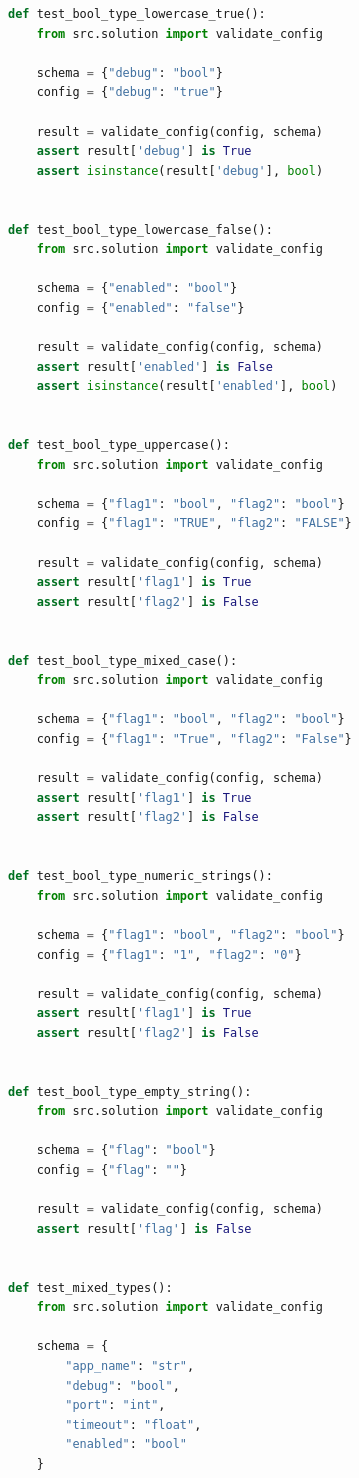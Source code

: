 \begin{appendices}
\begin{lstlisting}[language=Python]
def test_bool_type_lowercase_true():
    from src.solution import validate_config
    
    schema = {"debug": "bool"}
    config = {"debug": "true"}
    
    result = validate_config(config, schema)
    assert result['debug'] is True
    assert isinstance(result['debug'], bool)


def test_bool_type_lowercase_false():
    from src.solution import validate_config
    
    schema = {"enabled": "bool"}
    config = {"enabled": "false"}
    
    result = validate_config(config, schema)
    assert result['enabled'] is False
    assert isinstance(result['enabled'], bool)


def test_bool_type_uppercase():
    from src.solution import validate_config
    
    schema = {"flag1": "bool", "flag2": "bool"}
    config = {"flag1": "TRUE", "flag2": "FALSE"}
    
    result = validate_config(config, schema)
    assert result['flag1'] is True
    assert result['flag2'] is False


def test_bool_type_mixed_case():
    from src.solution import validate_config
    
    schema = {"flag1": "bool", "flag2": "bool"}
    config = {"flag1": "True", "flag2": "False"}
    
    result = validate_config(config, schema)
    assert result['flag1'] is True
    assert result['flag2'] is False


def test_bool_type_numeric_strings():
    from src.solution import validate_config
    
    schema = {"flag1": "bool", "flag2": "bool"}
    config = {"flag1": "1", "flag2": "0"}
    
    result = validate_config(config, schema)
    assert result['flag1'] is True
    assert result['flag2'] is False


def test_bool_type_empty_string():
    from src.solution import validate_config
    
    schema = {"flag": "bool"}
    config = {"flag": ""}
    
    result = validate_config(config, schema)
    assert result['flag'] is False


def test_mixed_types():
    from src.solution import validate_config
    
    schema = {
        "app_name": "str",
        "debug": "bool",
        "port": "int",
        "timeout": "float",
        "enabled": "bool"
    }
    

\end{lstlisting}
\end{appendices}
